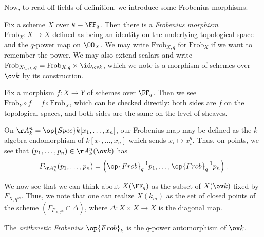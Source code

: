\documentclass[../notes.tex]{subfiles}
\begin{document}
Now, to read off fields of definition, we introduce some Frobenius morphisms.
\begin{definition}
	Fix a scheme $X$ over $k=\FF_q$. Then there is a \textit{Frobenius morphism} $\mathrm{Frob}_X\colon X\to X$ defined as being an identity on the underlying topological space and the $q$-power map on $\OO_X$. We may write $\mathrm{Frob}_{X,q}$ for $\mathrm{Frob}_X$ if we want to remember the power. We may also extend scalars and write $\mathrm{Frob}_{X_{\ov k},q}=\mathrm{Frob}_{X,q}\times\id_{\ov k}$, which we note is a morphism of schemes over $\ov k$ by its construction.
\end{definition}
\begin{remark}
	Fix a morphism $f\colon X\to Y$ of schemes over $\FF_q$. Then we see $\mathrm{Frob}_Y\circ f=f\circ \mathrm{Frob}_X$, which can be checked directly: both sides are $f$ on the topological spaces, and both sides are the same on the level of sheaves.
\end{remark}
\begin{example}
	On $\AA^n_k=\op{Spec}k[x_1,\ldots,x_n]$, our Frobenius map may be defined as the $k$-algebra endomorphism of $k[x_1,\ldots,x_n]$ which sends $x_i\mapsto x_i^q$. Thus, on points, we see that $(p_1,\ldots,p_n)\in\AA^n_k(\ov k)$ has
	\[F_{\AA^n_k}(p_1,\ldots,p_n)=\left(\op{Frob}_{q}^{-1}p_1,\ldots,\op{Frob}_q^{-1}p_n\right).\]
\end{example}
\begin{remark}
	We now see that we can think about $X(\FF_q)$ as the subset of $X(\ov k)$ fixed by $F_{X,q^m}$. Thus, we note that one can realize $X(k_m)$ as the set of closed points of the scheme $(\Gamma_{F_{X,q^m}}\cap\Delta)$, where $\Delta\colon X\times X\to X$ is the diagonal map.
\end{remark}
\begin{definition}
	The \textit{arithmetic Frobenius} $\op{Frob}_k$ is the $q$-power automorphism of $\ov k$.
\end{definition}
\end{document}
